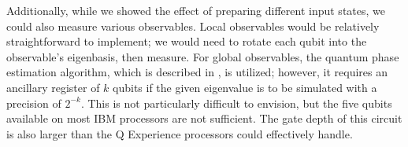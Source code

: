 \documentclass[10pt]{amsart}
\theoremstyle{definition}
\begin{document}
Additionally, while we showed the effect of preparing different input states,
we could also measure various observables. Local observables would be relatively
straightforward to implement; we would need to rotate each qubit into the
observable's eigenbasis, then measure. For global observables, the quantum phase
estimation algorithm, which is described in \cite{NielsenChuang}, is utilized;
however, it requires an ancillary register of $k$ qubits if the given eigenvalue
is to be simulated with a precision of $2^{-k}$. This is not particularly
difficult to envision, but the five qubits available on most IBM processors are
not sufficient. The gate depth of this circuit is also larger than the Q
Experience processors could effectively handle.

\clearpage 

\printbibliography
\end{document}
